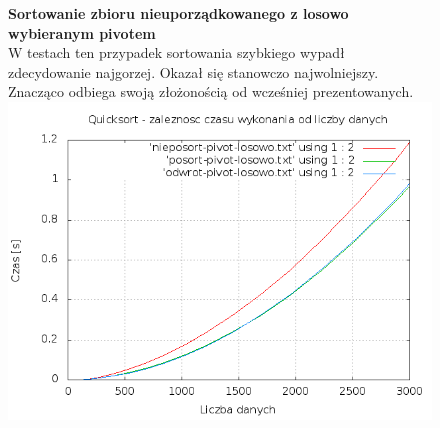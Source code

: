 \documentclass[a4paper,11pt]{report}
\begin{document}
\begin{figure}
  \begin{center}
  \textbf{Sortowanie zbioru nieuporządkowanego z losowo wybieranym pivotem}
  \\W testach ten przypadek sortowania szybkiego wypadł zdecydowanie najgorzej. Okazał się stanowczo najwolniejszy. Znacząco odbiega swoją złożonością od wcześniej prezentowanych. 
  \\
  \includegraphics[scale=0.5]{./pivot-losowo.png}
    \label{fig:}
  \end{center}
\end{figure}
\end{document}
